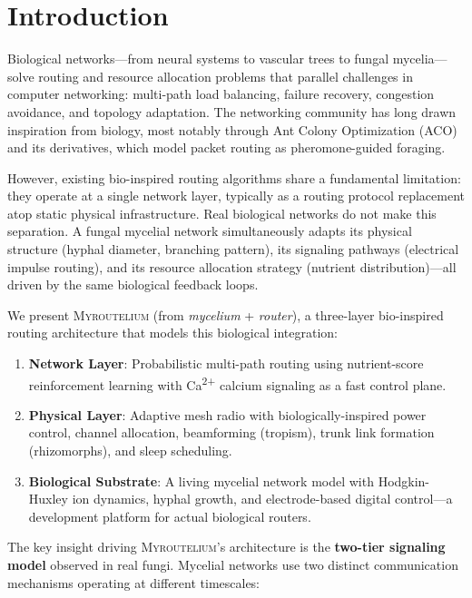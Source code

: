 \documentclass[conference,10pt]{IEEEtran}
\newcommand{\myc}{\textsc{Myroutelium}}
\newcommand{\calcium}{Ca\textsuperscript{2+}}
\begin{document}
\section{Introduction}
\label{sec:intro}

Biological networks---from neural systems to vascular trees to fungal mycelia---solve routing and resource allocation problems that parallel challenges in computer networking: multi-path load balancing, failure recovery, congestion avoidance, and topology adaptation. The networking community has long drawn inspiration from biology, most notably through Ant Colony Optimization (ACO)~\cite{dorigo2004} and its derivatives, which model packet routing as pheromone-guided foraging.

However, existing bio-inspired routing algorithms share a fundamental limitation: they operate at a single network layer, typically as a routing protocol replacement atop static physical infrastructure. Real biological networks do not make this separation. A fungal mycelial network simultaneously adapts its physical structure (hyphal diameter, branching pattern), its signaling pathways (electrical impulse routing), and its resource allocation strategy (nutrient distribution)---all driven by the same biological feedback loops.

We present \myc{} (from \emph{mycelium} + \emph{router}), a three-layer bio-inspired routing architecture that models this biological integration:

\begin{enumerate}
    \item \textbf{Network Layer}: Probabilistic multi-path routing using nutrient-score reinforcement learning with \calcium{} calcium signaling as a fast control plane.
    \item \textbf{Physical Layer}: Adaptive mesh radio with biologically-inspired power control, channel allocation, beamforming (tropism), trunk link formation (rhizomorphs), and sleep scheduling.
    \item \textbf{Biological Substrate}: A living mycelial network model with Hodgkin-Huxley ion dynamics, hyphal growth, and electrode-based digital control---a development platform for actual biological routers.
\end{enumerate}

The key insight driving \myc{}'s architecture is the \textbf{two-tier signaling model} observed in real fungi. Mycelial networks use two distinct communication mechanisms operating at different timescales:
\end{document}
